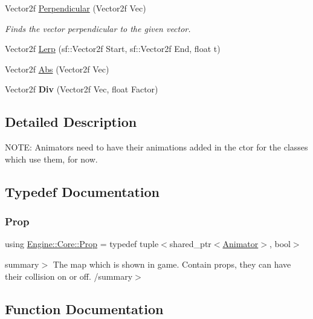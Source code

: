 \begin{DoxyCompactItemize}
Vector2f \hyperlink{namespace_engine_1_1_core_a5c9f2a12905370df10a29ffd47e8e919}{Perpendicular} (Vector2f Vec)
\begin{DoxyCompactList}\small\item\em Finds the vector perpendicular to the given vector. \end{DoxyCompactList}\item 
Vector2f \hyperlink{namespace_engine_1_1_core_a98107ac0730234291d51fea94ff04ce1}{Lerp} (sf\+::\+Vector2f Start, sf\+::\+Vector2f End, float t)
\item 
Vector2f \hyperlink{namespace_engine_1_1_core_ab86967f310b47cf168e87591f207cf04}{Abs} (Vector2f Vec)
\item 
\mbox{\label{namespace_engine_1_1_core_a8c45e2c1031721ea1f73ccae7e92ffc0}} 
Vector2f {\bfseries Div} (Vector2f Vec, float Factor)
\end{DoxyCompactItemize}


\subsection{Detailed Description}
N\+O\+TE\+: Animators need to have their animations added in the ctor for the classes which use them, for now. 

\subsection{Typedef Documentation}
\mbox{\label{namespace_engine_1_1_core_aa19279815c8e1c96d68332fcaa7d59d8}} 
\subsubsection{\texorpdfstring{Prop}{Prop}}
{\footnotesize\ttfamily using \hyperlink{namespace_engine_1_1_core_aa19279815c8e1c96d68332fcaa7d59d8}{Engine\+::\+Core\+::\+Prop} = typedef tuple$<$shared\+\_\+ptr$<$\hyperlink{class_engine_1_1_core_1_1_animator}{Animator}$>$, bool$>$}

summary$>$ The map which is shown in game. Contain props, they can have their collision on or off. /summary$>$ 

\subsection{Function Documentation}
\mbox{\label{namespace_engine_1_1_core_ab86967f310b47cf168e87591f207cf04}} 
